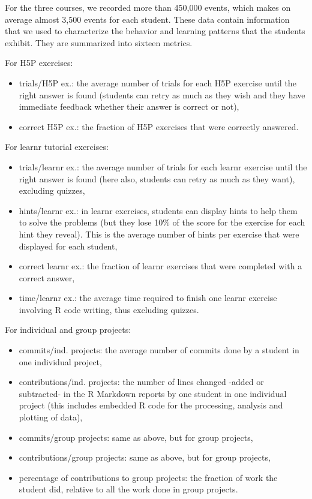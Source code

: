 \documentclass{aims}
\theoremstyle{definition}
\begin{document}
For the three courses, we recorded more than 450,000 events, which makes
on average almost 3,500 events for each student. These data contain
information that we used to characterize the behavior and learning
patterns that the students exhibit. They are summarized into sixteen
metrics.

For H5P exercises:

\begin{itemize}
\item
  trials/H5P ex.: the average number of trials for each H5P exercise
  until the right answer is found (students can retry as much as they
  wish and they have immediate feedback whether their answer is correct
  or not),
\item
  correct H5P ex.: the fraction of H5P exercises that were correctly
  answered.
\end{itemize}

For learnr tutorial exercises:

\begin{itemize}
\item
  trials/learnr ex.: the average number of trials for each learnr
  exercise until the right answer is found (here also, students can
  retry as much as they want), excluding quizzes,
\item
  hints/learnr ex.: in learnr exercises, students can display hints to
  help them to solve the problems (but they lose 10\% of the score for
  the exercise for each hint they reveal). This is the average number of
  hints per exercise that were displayed for each student,
\item
  correct learnr ex.: the fraction of learnr exercises that were
  completed with a correct answer,
\item
  time/learnr ex.: the average time required to finish one learnr
  exercise involving R code writing, thus excluding quizzes.
\end{itemize}

For individual and group projects:

\begin{itemize}
\item
  commits/ind. projects: the average number of commits done by a student
  in one individual project,
\item
  contributions/ind. projects: the number of lines changed -added or
  subtracted- in the R Markdown reports by one student in one individual
  project (this includes embedded R code for the processing, analysis
  and plotting of data),
\item
  commits/group projects: same as above, but for group projects,
\item
  contributions/group projects: same as above, but for group projects,
\item
  percentage of contributions to group projects: the fraction of work
  the student did, relative to all the work done in group projects.
\end{itemize}
\end{document}
